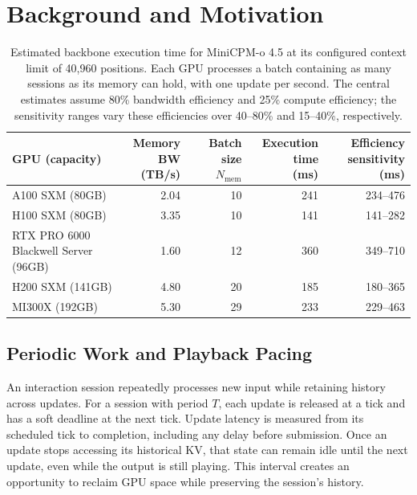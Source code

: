 \section{Background and Motivation}
\label{sec:problem}

\begin{table}[t]
  \centering
  \caption{Estimated backbone execution time for MiniCPM-o 4.5 at its configured context limit of 40,960 positions.
  Each GPU processes a batch containing as many sessions as its memory can hold, with one update per second.
  The central estimates assume 80\% bandwidth efficiency and 25\% compute efficiency; the sensitivity ranges vary these efficiencies over 40--80\% and 15--40\%, respectively.}
  \label{tab:hardware-capacity-projection}
  \begin{tabular}{lrrrr}
    \toprule
    GPU (capacity) & \shortstack{Memory BW\\(TB/s)} & \shortstack{Batch size\\$N_{\mathrm{mem}}$} & \shortstack{Execution time\\(ms)} & \shortstack{Efficiency sensitivity\\(ms)} \\
    \midrule
    A100 SXM (80GB) & 2.04 & 10 & 241 & 234--476 \\
    H100 SXM (80GB) & 3.35 & 10 & 141 & 141--282 \\
    RTX PRO 6000 Blackwell Server (96GB) & 1.60 & 12 & 360 & 349--710 \\
    H200 SXM (141GB) & 4.80 & 20 & 185 & 180--365 \\
    MI300X (192GB) & 5.30 & 29 & 233 & 229--463 \\
    \bottomrule
  \end{tabular}
\end{table}

\subsection{Periodic Work and Playback Pacing}
\label{sec:request-classes}
\label{sec:formulation}

An interaction session repeatedly processes new input while retaining history across updates.
For a session with period $T$, each update is released at a tick and has a soft deadline at the next tick.
Update latency is measured from its scheduled tick to completion, including any delay before submission.
Once an update stops accessing its historical KV, that state can remain idle until the next update, even while the output is still playing.
This interval creates an opportunity to reclaim GPU space while preserving the session's history.

